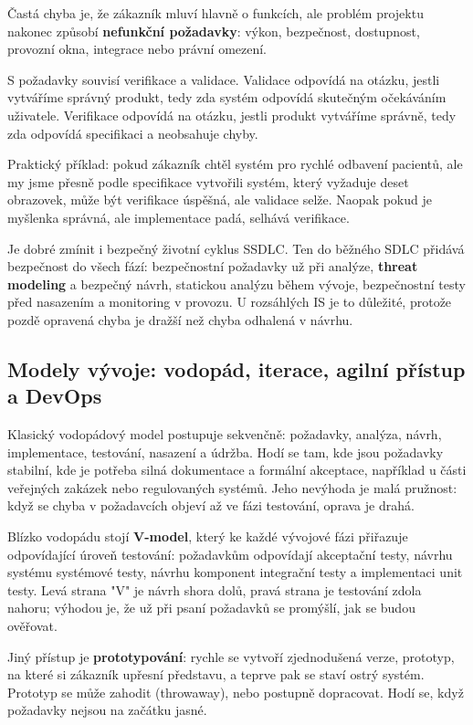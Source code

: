 \documentclass[11pt,a4paper]{article}
\begin{document}
Častá chyba je, že zákazník mluví hlavně o funkcích, ale problém projektu nakonec způsobí \textbf{nefunkční požadavky}: výkon, bezpečnost, dostupnost, provozní okna, integrace nebo právní omezení.

S požadavky souvisí verifikace a validace. Validace odpovídá na otázku, jestli vytváříme správný produkt, tedy zda systém odpovídá skutečným očekáváním uživatele. Verifikace odpovídá na otázku, jestli produkt vytváříme správně, tedy zda odpovídá specifikaci a neobsahuje chyby.

Praktický příklad: pokud zákazník chtěl systém pro rychlé odbavení pacientů, ale my jsme přesně podle specifikace vytvořili systém, který vyžaduje deset obrazovek, může být verifikace úspěšná, ale validace selže. Naopak pokud je myšlenka správná, ale implementace padá, selhává verifikace.

Je dobré zmínit i bezpečný životní cyklus SSDLC. Ten do běžného SDLC přidává bezpečnost do všech fází: bezpečnostní požadavky už při analýze, \textbf{threat modeling} a bezpečný návrh, statickou analýzu během vývoje, bezpečnostní testy před nasazením a monitoring v provozu. U rozsáhlých IS je to důležité, protože pozdě opravená chyba je dražší než chyba odhalená v návrhu.

\subsection*{Modely vývoje: vodopád, iterace, agilní přístup a DevOps}

Klasický vodopádový model postupuje sekvenčně: požadavky, analýza, návrh, implementace, testování, nasazení a údržba. Hodí se tam, kde jsou požadavky stabilní, kde je potřeba silná dokumentace a formální akceptace, například u části veřejných zakázek nebo regulovaných systémů. Jeho nevýhoda je malá pružnost: když se chyba v požadavcích objeví až ve fázi testování, oprava je drahá.

Blízko vodopádu stojí \textbf{V-model}, který ke každé vývojové fázi přiřazuje odpovídající úroveň testování: požadavkům odpovídají akceptační testy, návrhu systému systémové testy, návrhu komponent integrační testy a implementaci unit testy. Levá strana "V" je návrh shora dolů, pravá strana je testování zdola nahoru; výhodou je, že už při psaní požadavků se promýšlí, jak se budou ověřovat.

Jiný přístup je \textbf{prototypování}: rychle se vytvoří zjednodušená verze, prototyp, na které si zákazník upřesní představu, a teprve pak se staví ostrý systém. Prototyp se může zahodit (throwaway), nebo postupně dopracovat. Hodí se, když požadavky nejsou na začátku jasné.
\end{document}
